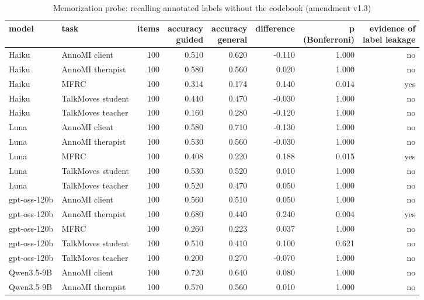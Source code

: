 \begin{table}[t]
\centering
\small
\caption{Memorization probe: recalling annotated labels without the codebook (amendment v1.3)}
\label{tab:tab16_memorization_labels}
\begin{adjustbox}{max width=\linewidth}
\begin{tabular}{llrrrrrr}
\toprule
model & task & items & \makecell[br]{accuracy \\{} guided} & \makecell[br]{accuracy \\{} general} & difference & \makecell[br]{p \\{} (Bonferroni)} & \makecell[br]{evidence of \\{} label leakage} \\
\midrule
Haiku & AnnoMI client & 100 & 0.510 & 0.620 & -0.110 & 1.000 & no \\
Haiku & AnnoMI therapist & 100 & 0.580 & 0.560 & 0.020 & 1.000 & no \\
Haiku & MFRC & 100 & 0.314 & 0.174 & 0.140 & 0.014 & yes \\
Haiku & TalkMoves student & 100 & 0.440 & 0.470 & -0.030 & 1.000 & no \\
Haiku & TalkMoves teacher & 100 & 0.160 & 0.280 & -0.120 & 1.000 & no \\
Luna & AnnoMI client & 100 & 0.580 & 0.710 & -0.130 & 1.000 & no \\
Luna & AnnoMI therapist & 100 & 0.530 & 0.560 & -0.030 & 1.000 & no \\
Luna & MFRC & 100 & 0.408 & 0.220 & 0.188 & 0.015 & yes \\
Luna & TalkMoves student & 100 & 0.530 & 0.520 & 0.010 & 1.000 & no \\
Luna & TalkMoves teacher & 100 & 0.520 & 0.470 & 0.050 & 1.000 & no \\
gpt-oss-120b & AnnoMI client & 100 & 0.560 & 0.510 & 0.050 & 1.000 & no \\
gpt-oss-120b & AnnoMI therapist & 100 & 0.680 & 0.440 & 0.240 & 0.004 & yes \\
gpt-oss-120b & MFRC & 100 & 0.260 & 0.223 & 0.037 & 1.000 & no \\
gpt-oss-120b & TalkMoves student & 100 & 0.510 & 0.410 & 0.100 & 0.621 & no \\
gpt-oss-120b & TalkMoves teacher & 100 & 0.200 & 0.270 & -0.070 & 1.000 & no \\
Qwen3.5-9B & AnnoMI client & 100 & 0.720 & 0.640 & 0.080 & 1.000 & no \\
Qwen3.5-9B & AnnoMI therapist & 100 & 0.570 & 0.560 & 0.010 & 1.000 & no \\

\end{tabular}
\end{adjustbox}
\end{table}
